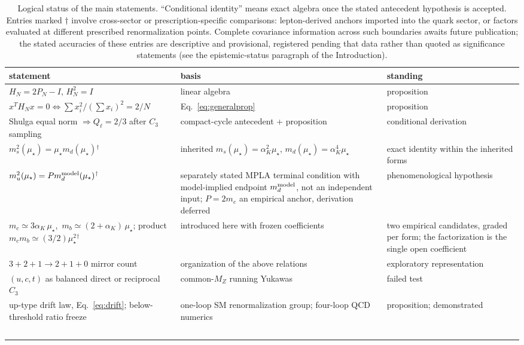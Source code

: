 \documentclass[aps,twocolumn,superscriptaddress,nofootinbib,floatfix]{revtex4-2}
\newcommand{\mstar}{\mu_\star}
\newcommand{\alphaK}{\alpha_K}
\begin{document}
\begin{table}[t]
\caption{Logical status of the main statements. ``Conditional identity'' means exact algebra once the stated antecedent hypothesis is accepted. Entries marked $\dagger$ involve cross-sector or prescription-specific comparisons: lepton-derived anchors imported into the quark sector, or factors evaluated at different prescribed renormalization points. Complete covariance information across such boundaries awaits future publication; the stated accuracies of these entries are descriptive and provisional, registered pending that data rather than quoted as significance statements (see the epistemic-status paragraph of the Introduction).}
\label{tab:status}
\begin{ruledtabular}
\begin{tabular}{p{}p{}p{}}
statement & basis & standing \\
\hline
$H_N=2P_N-I$, $H_N^2=I$ & linear algebra & proposition \\
$x^TH_Nx=0\iff \sum x_i^2/(\sum x_i)^2=2/N$ & Eq.~\eqref{eq:generalprop} & proposition \\
Shulga equal norm $\Rightarrow Q_\ell=2/3$ after $C_3$ sampling & compact-cycle antecedent + proposition & conditional derivation \\
$m_s^2(\mstar)=\mstar m_d(\mstar)$$^\dagger$ & inherited $m_s(\mstar)=\alpha_K^2\mstar$, $m_d(\mstar)=\alpha_K^4\mstar$~\cite{BrilliantMPLA} & exact identity within the inherited forms \\
$m_u^2(\mstar)=P m_d^{\rm model}(\mstar)$$^\dagger$ & separately stated MPLA terminal condition with model-implied endpoint $m_d^{\rm model}$, not an independent input; $P=2m_e$ an empirical anchor, derivation deferred & phenomenological hypothesis \\
$m_c\simeq3\alphaK\,\mstar$,\ $m_b\simeq(2+\alphaK)\,\mstar$; product $m_cm_b\simeq(3/2)\mstar^2$$^\dagger$ & introduced here with frozen coefficients & two empirical candidates, graded per form; the factorization is the single open coefficient \\
$3+2+1\to2+1+0$ mirror count & organization of the above relations & exploratory representation \\
$(u,c,t)$ as balanced direct or reciprocal $C_3$ & common-$M_Z$ running Yukawas & failed test \\
up-type drift law, Eq.~\eqref{eq:drift}; below-threshold ratio freeze & one-loop SM renormalization group; four-loop QCD numerics & proposition; demonstrated \\
$$
\end{tabular}
\end{ruledtabular}
\end{table}
\end{document}
